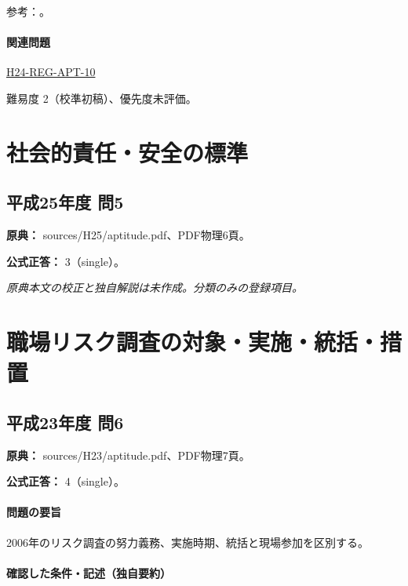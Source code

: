 \par 参考：\cite{saf_ra2006,saf_fsc_psych}。

\paragraph{関連問題} \hyperref[q:h24-reg-apt-10]{H24-REG-APT-10}

\par 難易度 2（校準初稿）、優先度未評価。

\section{社会的責任・安全の標準}

\subsection{平成25年度 問5}
\label{q:h25-reg-apt-05}

\noindent\textbf{原典：} sources/H25/aptitude.pdf、PDF物理6頁。

\textbf{公式正答：} 3（single）。

\par\textit{原典本文の校正と独自解説は未作成。分類のみの登録項目。}

\section{職場リスク調査の対象・実施・統括・措置}

\subsection{平成23年度 問6}
\label{q:h23-reg-apt-06}

\noindent\textbf{原典：} sources/H23/aptitude.pdf、PDF物理7頁。

\textbf{公式正答：} 4（single）。

\paragraph{問題の要旨} 2006年のリスク調査の努力義務、実施時期、統括と現場参加を区別する。

\paragraph{確認した条件・記述（独自要約）}\mbox{}\par

